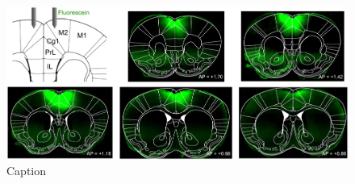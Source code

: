 \begin{figure}[htbp]

\begin{center}
\includegraphics[width=\textwidth]{Figures/NN_figS4.jpg} 
\end{center}

\caption[Approximating the spread of muscimol with fluorescein]
{Caption}

\label{fig:NN_figS4}
\end{figure}